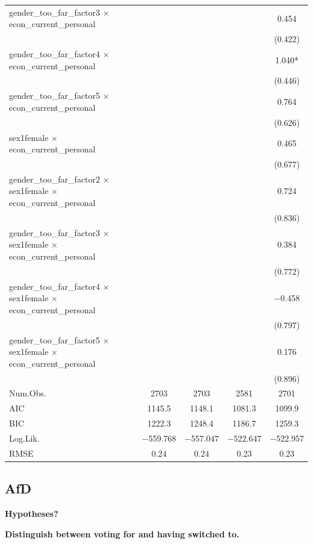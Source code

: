 \documentclass[
]{article}
\begin{document}
\begin{table}
{\begin{tabular}[t]{lcccc}
gender\_too\_far\_factor3 × econ\_current\_personal &  &  &  & \num{0.454}\\
 &  &  &  & (\num{0.422})\\
gender\_too\_far\_factor4 × econ\_current\_personal &  &  &  & \num{1.040}*\\
 &  &  &  & (\num{0.446})\\
gender\_too\_far\_factor5 × econ\_current\_personal &  &  &  & \num{0.764}\\
 &  &  &  & (\num{0.626})\\
sex1female × econ\_current\_personal &  &  &  & \num{0.465}\\
 &  &  &  & (\num{0.677})\\
gender\_too\_far\_factor2 × sex1female × econ\_current\_personal &  &  &  & \num{0.724}\\
 &  &  &  & (\num{0.836})\\
gender\_too\_far\_factor3 × sex1female × econ\_current\_personal &  &  &  & \num{0.384}\\
 &  &  &  & (\num{0.772})\\
gender\_too\_far\_factor4 × sex1female × econ\_current\_personal &  &  &  & \num{-0.458}\\
 &  &  &  & (\num{0.797})\\
gender\_too\_far\_factor5 × sex1female × econ\_current\_personal &  &  &  & \num{0.176}\\
 &  &  &  & (\num{0.896})\\
\midrule
Num.Obs. & \num{2703} & \num{2703} & \num{2581} & \num{2701}\\
AIC & \num{1145.5} & \num{1148.1} & \num{1081.3} & \num{1099.9}\\
BIC & \num{1222.3} & \num{1248.4} & \num{1186.7} & \num{1259.3}\\
Log.Lik. & \num{-559.768} & \num{-557.047} & \num{-522.647} & \num{-522.957}\\
RMSE & \num{0.24} & \num{0.24} & \num{0.23} & \num{0.23}\\
\bottomrule
\end{tabular}}
\end{table}

\hypertarget{afd}{%
\subsection{AfD}\label{afd}}

\textbf{Hypotheses?}

\textbf{Distinguish between voting for and having switched to.}
\end{document}
